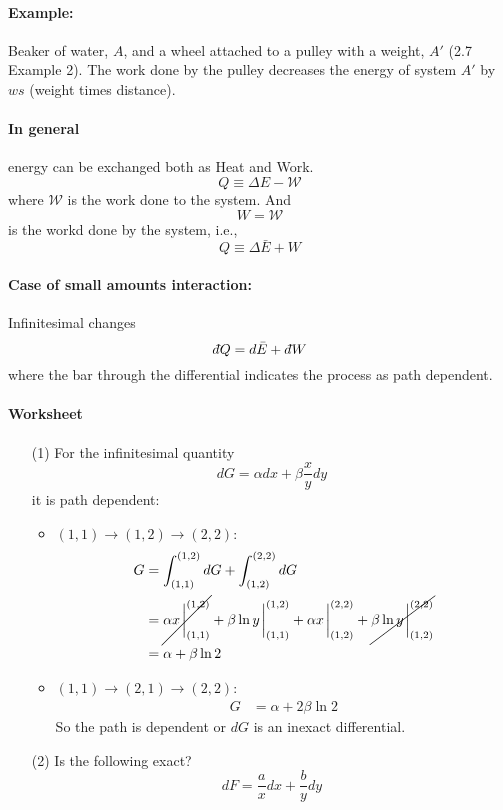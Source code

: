 \documentclass[../main.tex]{subfiles}
\begin{document}
\paragraph*{Example:} Beaker of water, $A$, and a wheel attached to a pulley with a weight, $A'$ (2.7 Example 2). The work done by the pulley decreases the energy of system $A'$ by $ws$ (weight times distance).

\paragraph*{In general} energy can be exchanged both as Heat and Work.
\[Q \equiv \Delta E - \mathcal{W}\]
where $\mathcal{W}$ is the work done to the system. And
\[W = \mathcal{W}\]
is the workd done by the system, i.e.,
\[Q \equiv \Delta \bar E + W\]

\paragraph*{Case of small amounts interaction:} Infinitesimal changes
\[d\hspace*{-0.08em}\bar{}\hspace*{0.1em} Q = d \bar E + d\hspace*{-0.08em}\bar{}\hspace*{0.1em} W \]
where the bar through the differential indicates the process as path dependent.

\paragraph*{Worksheet}
\begin{enumerate}
    \item [(1)] For the infinitesimal quantity
    \[dG = \alpha dx + \beta \frac{x}{y} dy\]
    it is path dependent:
    \begin{itemize}
        \item $(1,1) \to (1,2) \to (2,2)$:
        \begin{align*}
            G &= \int_{(1,1)}^{(1,2)} dG + \int_{(1,2)}^{(2,2)} dG \\
            &= \cancel{\alpha x\eval_{(1,1)}^{(1,2)}} + \beta \ln y\eval_{(1,1)}^{(1,2)} + \alpha x\eval_{(1,2)}^{(2,2)} + \cancel{\beta \ln y\eval_{(1,2)}^{(2,2)}} \\
            &= \alpha + \beta \ln 2
        \end{align*}
        \item $(1,1) \to (2,1) \to (2,2)$:
        \begin{align*}
            G &= \alpha + 2\beta \ln 2
        \end{align*}
        So the path is dependent or $dG$ is an inexact differential.
    \end{itemize}
    \item [(2)] Is the following exact?
    \[dF = \frac{a}{x} dx + \frac{b}{y} dy \]
\end{enumerate}
\end{document}
